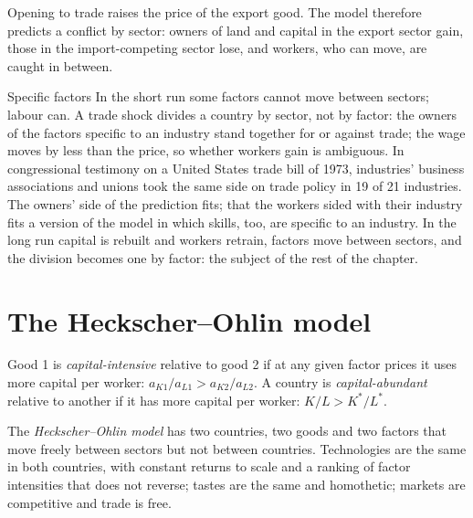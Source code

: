 Opening to trade raises the price of the export good. The model therefore
predicts a conflict by sector: owners of land and capital in the export
sector gain, those in the import-competing sector lose, and workers, who can
move, are caught in between.

\begin{model}{Specific factors}
\assumes In the short run some factors cannot move between sectors; labour can.
\predicts A trade shock divides a country by sector, not by factor: the owners
of the factors specific to an industry stand together for or against trade; the
wage moves by less than the price, so whether workers gain is ambiguous.
\tested In congressional testimony on a United States trade bill of 1973,
industries' business associations and unions took the same side on trade policy
in 19 of 21 industries. %
The owners' side of the prediction fits; that the workers sided with their
industry fits a version of the model in which skills, too, are specific to an
industry.
\breaks In the long run capital is rebuilt and workers retrain, factors move
between sectors, and the division becomes one by factor: the subject of the
rest of the chapter.
\end{model}

\section{The Heckscher--Ohlin model}\label{sec:b3:factor-endowments:ho}

\begin{definition}\label{def:b3:factor-endowments:intensity}
Good 1 is \emph{capital-intensive} relative to good 2 if at any given factor
prices it uses more capital per worker: $a_{K1}/a_{L1} > a_{K2}/a_{L2}$. A country is
\emph{capital-abundant} relative to another if it has more capital per worker:
$K/L > K^*/L^*$.
\end{definition}

\begin{definition}\label{def:b3:factor-endowments:ho}
The \emph{Heckscher--Ohlin model} has two countries, two goods and two factors
that move freely between sectors but not between countries. Technologies are the
same in both countries, with constant returns to scale and a ranking of factor
intensities that does not reverse; tastes are the same and homothetic; markets
are competitive and trade is free.
\end{definition}

